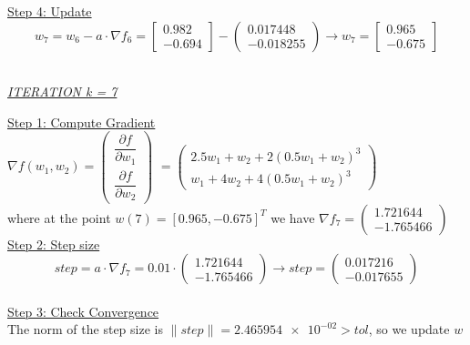 \underline{Step 4: Update}
\[ 
w_7 = w_6 - a\cdot \nabla f_6 =  \left[\begin{array}{c}
	0.982\\
	-0.694
\end{array}\right] - \left(\begin{array}{c}
0.017448 \\
-0.018255
\end{array}\right) \rightarrow
w_7 = \left[\begin{array}{c}
	0.965\\
	-0.675
\end{array}\right]
\]
\\[4mm]

\begin{center}
	\underline{\textit{ITERATION k = 7}}
\end{center}

\underline{Step 1: Compute Gradient}\\
\(\nabla f(w_1,w_2) = \left(\begin{array}{c}
	\dfrac{\partial f}{\partial w_1} \\[4mm]
	\dfrac{\partial f}{\partial w_2}
\end{array}\right)\) $= \left(\begin{array}{c}
	2.5w_1 + w_2 + 2(0.5w_1+w_2)^3\\[1mm]
	w_1 + 4w_2 + 4(0.5w_1+w_2)^3
\end{array}\right)$ \\[3mm]

where at the point $w\left(7\right) = \left[0.965, -0.675\right]^T$ we have $\nabla f_{7} = \left(\begin{array}{c}
	1.721644 \\
-1.765466
\end{array}\right)$
\\[4mm]

\underline{Step 2: Step size}
\[
step = a \cdot \nabla f_{7} = 0.01 \cdot \left(\begin{array}{c}
	1.721644 \\
-1.765466
\end{array}\right) \rightarrow step =\left(\begin{array}{c}
0.017216 \\
-0.017655
\end{array}\right)
\]
\\[4mm]

\underline{Step 3: Check Convergence}\\
The norm of the step size is $\| step \| = \num{2.465954e-02} > tol$, so we update $w$
\\[4mm]


